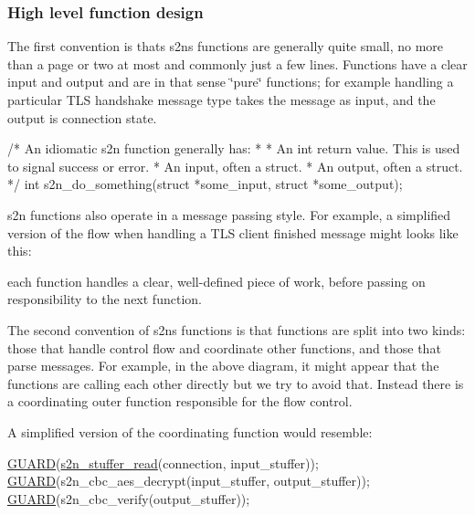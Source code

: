 \subsubsection*{High level function design}

The first convention is that\textquotesingle{}s s2n\textquotesingle{}s functions are generally quite small, no more than a page or two at most and commonly just a few lines. Functions have a clear input and output and are in that sense \char`\"{}pure\char`\"{} functions; for example handling a particular T\+LS handshake message type takes the message as input, and the output is connection state.


\begin{DoxyCode}
\textcolor{comment}{/* An idiomatic s2n function generally has:}
\textcolor{comment}{ * }
\textcolor{comment}{ *  An int return value. This is used to signal success or error.}
\textcolor{comment}{ *  An input, often a struct.}
\textcolor{comment}{ *  An output, often a struct.}
\textcolor{comment}{ */}
\textcolor{keywordtype}{int} s2n\_do\_something(\textcolor{keyword}{struct} *some\_input, \textcolor{keyword}{struct} *some\_output);
\end{DoxyCode}


s2n functions also operate in a message passing style. For example, a simplified version of the flow when handling a T\+LS client finished message might looks like this\+:



each function handles a clear, well-\/defined piece of work, before passing on responsibility to the next function.

The second convention of s2n\textquotesingle{}s functions is that functions are split into two kinds\+: those that handle control flow and coordinate other functions, and those that parse messages. For example, in the above diagram, it might appear that the functions are calling each other directly but we try to avoid that. Instead there is a coordinating outer function responsible for the flow control.

A simplified version of the coordinating function would resemble\+:


\begin{DoxyCode}
\hyperlink{s2n__safety_8h_ad400572229cc8e40f7996837deb680f3}{GUARD}(\hyperlink{s2n__stuffer_8c_a49bb9749c055c6fb6f713cebeaa14cb5}{s2n\_stuffer\_read}(connection, input\_stuffer));
\hyperlink{s2n__safety_8h_ad400572229cc8e40f7996837deb680f3}{GUARD}(s2n\_cbc\_aes\_decrypt(input\_stuffer, output\_stuffer));
\hyperlink{s2n__safety_8h_ad400572229cc8e40f7996837deb680f3}{GUARD}(s2n\_cbc\_verify(output\_stuffer));
\end{DoxyCode}


